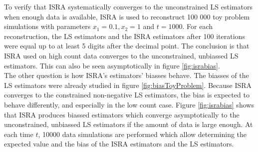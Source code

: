 \documentclass[report,12pt]{report}
\begin{document}
To verify that ISRA systematically converges to the unconstrained LS estimators when enough data is available, ISRA is used to reconstruct 100 000 toy problem simulations with parameters $x_1 = 0.1, x_2 = 1$ and $t = 1000$. For each reconstruction, the LS estimators and the ISRA estimators after 100 iterations were equal up to at least 5 digits after the decimal point. The conclusion is that ISRA used on high count data converges to the unconstrained, unbiassed LS estimators. This can also be seen asymptotically in figure \ref{fig:israbias}.\\

The other question is how ISRA's estimators' biasses behave. The biasses of the LS estimators were already studied in figure \ref{fig:biasToyProblem}. Because ISRA converges to the constrained non-negative LS estimators, the bias is expected to behave differently, and especially in the low count case. Figure \ref{fig:israbias} shows that ISRA produces biassed estimators which converge asymptotically to the unconstrained, unbiassed LS estimators if the amount of data is large enough. At each time $t$, 10000 data simulations are performed which allow determining the expected value and the bias of the ISRA estimators and the LS estimators.\\
\end{document}

